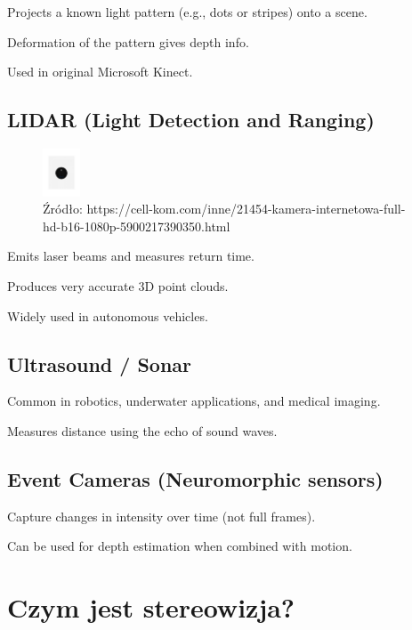 \documentclass[magisterska]{pracadypl}
\begin{document}
Projects a known light pattern (e.g., dots or stripes) onto a scene.

Deformation of the pattern gives depth info.

Used in original Microsoft Kinect.

\subsection{LIDAR (Light Detection and Ranging)}

\begin{figure}[h]  %
    \centering  %
    \includegraphics[width=0.1\textwidth]{images/LIDAR.jpg}  %
    \captionsetup{labelformat=empty, font=footnotesize}
    \caption{Źródło: https://cell-kom.com/inne/21454-kamera-internetowa-full-hd-b16-1080p-5900217390350.html}
    \label{fig:mono}  %
\end{figure}

Emits laser beams and measures return time.

Produces very accurate 3D point clouds.

Widely used in autonomous vehicles.

\subsection{Ultrasound / Sonar}
Common in robotics, underwater applications, and medical imaging.

Measures distance using the echo of sound waves.

\subsection{Event Cameras (Neuromorphic sensors)}
Capture changes in intensity over time (not full frames).

Can be used for depth estimation when combined with motion.

\section{Czym jest stereowizja?}
\end{document}
